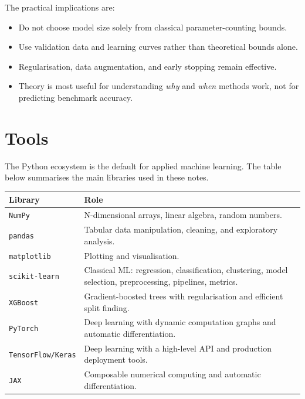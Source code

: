 \documentclass[a4paper, 12pt]{book}
\begin{document}
The practical implications are:
\begin{itemize}
    \item Do not choose model size solely from classical parameter-counting bounds.
    \item Use validation data and learning curves rather than theoretical bounds alone.
    \item Regularisation, data augmentation, and early stopping remain effective.
    \item Theory is most useful for understanding \emph{why} and \emph{when} methods
    work, not for predicting benchmark accuracy.
\end{itemize}


\chapter{Tools}
\label{ch:tools}

The Python ecosystem is the default for applied machine learning. The table below
summarises the main libraries used in these notes.

\begin{center}
\renewcommand{\arraystretch}{1.25}
\begin{tabularx}{\textwidth}{@{}l>{\raggedright\arraybackslash}X@{}}
\toprule
Library & Role \\
\midrule
\texttt{NumPy} & N-dimensional arrays, linear algebra, random numbers. \\
\texttt{pandas} & Tabular data manipulation, cleaning, and exploratory analysis. \\
\texttt{matplotlib} & Plotting and visualisation. \\
\texttt{scikit-learn} & Classical ML: regression, classification, clustering, model selection,
preprocessing, pipelines, metrics. \\
\texttt{XGBoost} & Gradient-boosted trees with regularisation and efficient split finding. \\
\texttt{PyTorch} & Deep learning with dynamic computation graphs and automatic differentiation. \\
\texttt{TensorFlow/Keras} & Deep learning with a high-level API and production deployment tools. \\
\texttt{JAX} & Composable numerical computing and automatic differentiation. \\
\bottomrule
\end{tabularx}
\end{center}
\end{document}
